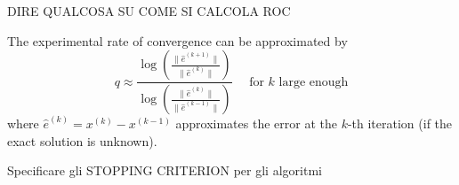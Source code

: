 {\large DIRE QUALCOSA SU COME SI CALCOLA ROC}

The experimental rate of convergence can be approximated by
\begin{equation}
    q \approx \frac{ \log \left(\frac{\| \hat{e}^{(k+1)} \|}{\| \hat{e}^{(k)} \|} \right)}{ \log \left(\frac{\| \hat{e}^{(k)} \|}{\| \hat{e}^{(k-1)} \|} \right)}
    \quad \text{ for $k$ large enough}
    \label{definizione_roc}
\end{equation}
where $\hat{e}^{(k)} = x^{(k)} - x^{(k-1)}$ approximates the error at the $k$-th iteration (if the exact solution is unknown).


\bigskip
{\large Specificare gli STOPPING CRITERION per gli algoritmi}